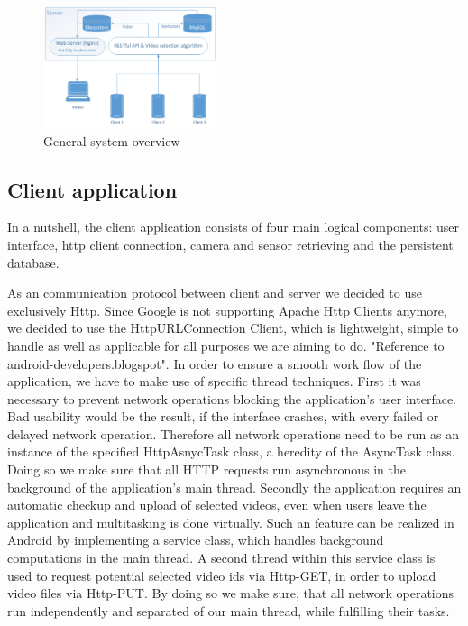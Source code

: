 \documentclass[conference]{IEEEtran}
\begin{document}
\begin{figure}[!t]
	\centering
	\includegraphics[width=0.45\textwidth]{sys_arch.png}
	\caption{General system overview}
	\label{fig:gen_arch}
\end{figure}

\subsection{Client application}

In a nutshell, the client application consists of four main logical components: user interface, http client connection, camera and sensor retrieving and the persistent database.

As an communication protocol between client and server we decided to use exclusively Http. Since Google is not supporting Apache Http Clients anymore, we decided to use the HttpURLConnection Client, which is lightweight, simple to handle as well as applicable for all purposes we are aiming to do. "Reference to android-developers.blogspot".
In order to ensure a smooth work flow of the application, we have to make use of specific thread techniques.
First it was necessary to prevent network operations blocking the application's user interface. Bad usability would be the result, if the interface crashes, with every failed or delayed network operation. Therefore all network operations need to be run as an instance of the specified HttpAsnycTask class, a heredity of the AsyncTask class. Doing so we make sure that all HTTP requests run asynchronous in the background of the application's main thread.
Secondly the application requires an automatic checkup and upload of selected videos, even when users leave the application and multitasking is done virtually. Such an feature can be realized in Android by implementing a service class, which handles background computations in the main thread. A second thread within this service class is used to request potential selected video ids via Http-GET, in order to upload video files via Http-PUT.
By doing so we make sure, that all network operations run independently and separated of our main thread, while fulfilling their tasks.
\end{document}
